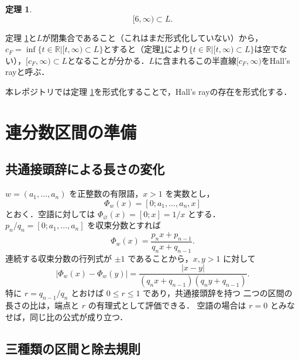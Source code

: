 \documentclass[10pt,a4paper]{ujarticle}
\newtheorem{theorem}{定理}
\begin{document}
\begin{theorem}
\label{theorem:ray}
\[
  [6,\infty)\subset L.
\]
\end{theorem}

定理 \ref{theorem:ray}と$L$が閉集合であること（これはまだ形式化していない）から，$c_F = \inf \{t \in \mathbb{R} | [t,\infty) \subset L\}$とすると（定理\ref{theorem:ray}により$\{t \in \mathbb{R} | [t,\infty) \subset L\}$は空でない），$[c_F, \infty) \subset L$となることが分かる．$L$に含まれるこの半直線$[c_F, \infty)$をHall's rayと呼ぶ．

本レポジトリでは定理 \ref{theorem:ray}を形式化することで，Hall's rayの存在を形式化する．

\section{連分数区間の準備}

\subsection{共通接頭辞による長さの変化}

$w=(a_1,\ldots,a_n)$ を正整数の有限語，$x>1$ を実数とし，
\[
  \Phi_w(x)=[0;a_1,\ldots,a_n,x]
\]
とおく．空語に対しては $\Phi_\varnothing(x)=[0;x]=1/x$ とする．
$p_n/q_n=[0;a_1,\ldots,a_n]$ を収束分数とすれば
\[
  \Phi_w(x)=\frac{p_nx+p_{n-1}}{q_nx+q_{n-1}}.
\]
連続する収束分数の行列式が $\pm1$ であることから，$x,y>1$ に対して
\begin{equation}
\label{eq:mobius-length}
  \lvert\Phi_w(x)-\Phi_w(y)\rvert
  =
  \frac{\lvert x-y\rvert}
       {(q_nx+q_{n-1})(q_ny+q_{n-1})}.
\end{equation}
特に $r=q_{n-1}/q_n$ とおけば $0\le r\le1$ であり，共通接頭辞を持つ
二つの区間の長さの比は，端点と $r$ の有理式として評価できる．
空語の場合は $r=0$ とみなせば，同じ比の公式が成り立つ．

\subsection{三種類の区間と除去規則}
\end{document}
